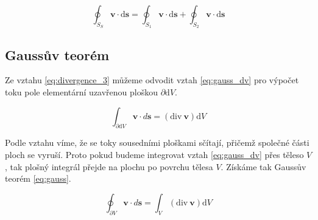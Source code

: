 \documentclass{book}
\newcommand{\vect}[1]{\boldsymbol{#1}}
\newcommand{\diverg}{\mathrm{div}}
\newcommand{\drawrect}[5]{   -- x1, y1, x2, y2, param
	\draw[#5] (#1, #2) -- (#3, #2) -- (#3, #4) -- (#1, #4) -- (#1, #2);
}
\newcommand{\drawbox}[6]{   -- x1, y1, x2, y2, d
	-- Front rectangle
	\drawrect{#1}{#2}{#3}{#4}{thick};
	
	-- Rear rectangle
	\draw[dashed] (#1 + #5, #4 + #5) -- (#1 + #5, #2 + #5) -- (#3 + #5, #2 + #5);
	\draw[thick] (#3 + #5, #2 + #5) -- (#3 + #5, #4 + #5) -- (#1 + #5, #4 + #5);
	
	-- Z edges
	\draw[dashed] (#1, #2) -- (#1 + #5, #2 + #5);
	\draw[thick] (#3, #2) -- (#3 + #5, #2 + #5);
	\draw[thick] (#3, #4) -- (#3 + #5, #4 + #5);
	\draw[thick] (#1, #4) -- (#1 + #5, #4 + #5);
}
\begin{document}


\begin{equation}
\label{eq:deleni_toku}
\oint_{S_S} \vect{v} \cdot \mathrm{d}\vect{s} = \oint_{S_1} \vect{v} \cdot \mathrm{d}\vect{s} + \oint_{S_2} \vect{v} \cdot \mathrm{d}\vect{s}
\end{equation}


\subsection{Gaussův teorém}

Ze vztahu \eqref{eq:divergence_3} můžeme odvodit vztah \eqref{eq:gauss_dv} pro výpočet toku pole elementární uzavřenou ploškou \(\partial \mathrm{d}V\).

\begin{equation}
\label{eq:gauss_dv}
\int_{\partial \mathrm{d}V} \vect{v} \cdot d\vect{s} = \left(\diverg \ \vect{v} \right) \mathrm{d}V
\end{equation}


Podle vztahu \label{eq:deleni_toku} víme, že se toky sousedními ploškami sčítají, přičemž společné části ploch se vyruší. Proto pokud budeme integrovat
vztah \eqref{eq:gauss_dv} přes těleso \(V\), tak plošný integrál přejde na plochu po povrchu tělesa \(V\). Získáme tak Gaussův teorém \eqref{eq:gauss}.

\begin{equation}
\label{eq:gauss}
\oint_{\partial V} \vect{v} \cdot d\vect{s} = \int_V \left(\diverg \ \vect{v} \right) \mathrm{d}V
\end{equation}
\end{document}
